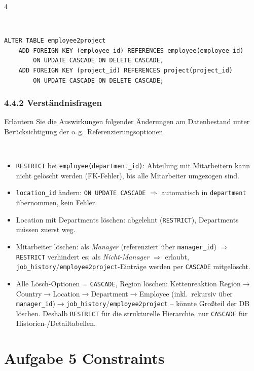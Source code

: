 \documentclass[8pt,a4paper]{extarticle}
\newcommand{\Kopf}[1]{}
\newenvironment{loesung}[1][]{%
    \par\noindent{\bfseries\color{loesungrahmen}\small$\blacktriangleright$~L\"osung#1:}~%
}{\par\smallskip}
\begin{document}
\begin{multicols}{4}
\begin{loesung}
\begin{lstlisting}
ALTER TABLE employee2project
    ADD FOREIGN KEY (employee_id) REFERENCES employee(employee_id)
        ON UPDATE CASCADE ON DELETE CASCADE,
    ADD FOREIGN KEY (project_id) REFERENCES project(project_id)
        ON UPDATE CASCADE ON DELETE CASCADE;
\end{lstlisting}
\end{loesung}

\subsubsection*{4.4.2 \quad Verst\"andnisfragen}
Erl\"autern Sie die Auswirkungen folgender \"Anderungen am Datenbestand unter Ber\"ucksichtigung der o.\,g.\ Referenzierungsoptionen.

\begin{loesung}
\begin{itemize}
\item \texttt{RESTRICT} bei \texttt{employee(department\_id)}: Abteilung mit Mitarbeitern kann nicht gel\"oscht werden (FK-Fehler), bis alle Mitarbeiter umgezogen sind.
\item \texttt{location\_id} \"andern: \texttt{ON UPDATE CASCADE} $\Rightarrow$ automatisch in \texttt{department} \"ubernommen, kein Fehler.
\item Location mit Departments l\"oschen: abgelehnt (\texttt{RESTRICT}), Departments m\"ussen zuerst weg.
\item Mitarbeiter l\"oschen: als \emph{Manager} (referenziert \"uber \texttt{manager\_id}) $\Rightarrow$ \texttt{RESTRICT} verhindert es; als \emph{Nicht-Manager} $\Rightarrow$ erlaubt, \texttt{job\_history}/\texttt{employee2project}-Eintr\"age werden per \texttt{CASCADE} mitgel\"oscht.
\item Alle L\"osch-Optionen = \texttt{CASCADE}, Region l\"oschen: Kettenreaktion Region$\to$Country$\to$Location$\to$Department$\to$Employee (inkl.\ rekursiv \"uber \texttt{manager\_id})$\to$\texttt{job\_history}/\texttt{employee2project} -- k\"onnte Gro\ss{}teil der DB l\"oschen. Deshalb \texttt{RESTRICT} f\"ur die strukturelle Hierarchie, nur \texttt{CASCADE} f\"ur Historien-/Detailtabellen.
\end{itemize}
\end{loesung}


\section*{Aufgabe 5 \quad Constraints}
\Kopf{Aufgabe 5 Constraints}


\end{multicols}
\end{document}
